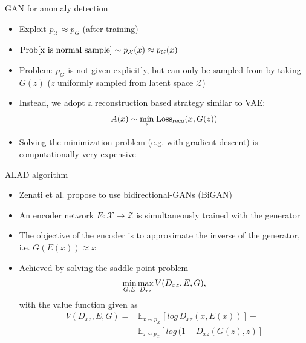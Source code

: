 \documentclass{beamer}
\begin{document}
\begin{frame}{GAN for anomaly detection}
  \begin{itemize}
      \item<1-> Exploit $p_\mathcal{X}\approx p_G$ (after training)
      \item<2-> $\textup{Prob[x \textup{is normal sample}]}\sim p_\mathcal{X}(x) \approx p_G(x)$
      \item<3-> Problem: $p_G$ is not given explicitly, but can only be sampled from by taking $G(z)$ ($z$ uniformly sampled from latent space $\mathcal{Z}$)
      \item<4-> Instead, we adopt a reconstruction based strategy similar to VAE:
      \begin{equation}
        A(x) \sim \underset{z}{\textup{min}} \; \textup{Loss}_{\textup{reco}}(x, G(z))
      \end{equation}
      \item<5-> Solving the minimization problem (e.g. with gradient descent) is computationally very expensive
  \end{itemize}
\end{frame}

\begin{frame}{ALAD algorithm}
  \begin{itemize}
      \item<1-> Zenati et al. propose to use bidirectional-GANs (BiGAN)
      \item<2-> An encoder network $E: \mathcal{X} \rightarrow \mathcal{Z}$ is simultaneously trained with the generator
      \item<3-> The objective of the encoder is to approximate the inverse of the generator, i.e. $G(E(x))\approx x$
      \item<4-> Achieved by solving the saddle point problem
      \begin{align}
    \underset{G,E}{\textup{min}}\, \underset{D_{xz}}{\textup{max}}\, V(D_{xz},E,G),
\end{align}
with the value function given as
\begin{equation}
\begin{split}
    V(D_{xz},E,G)=& \mathbb{E}_{x\sim p_\mathcal{X}}[log\,D_{xz}(x, E(x))] + \\
    & \mathbb{E}_{z\sim p_\mathcal{Z}}[log\,(1-D_{xz}(G(z), z)]
\end{split}
\end{equation}
  \end{itemize}
\end{frame}
\end{document}
